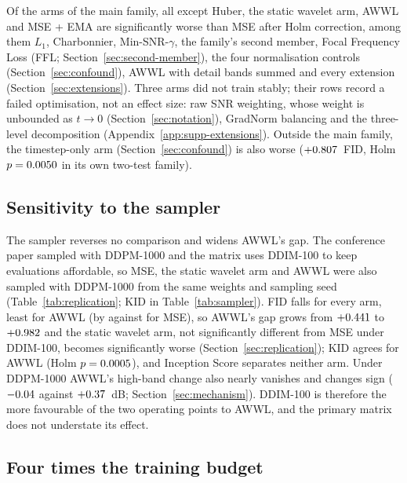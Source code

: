 Of the \nFamilyMain{} arms of the main family, all except Huber, the static
wavelet arm, AWWL and MSE + EMA are significantly worse than MSE after Holm
correction, among them $L_1$, Charbonnier, Min-SNR-$\gamma$, the family's
second member, Focal Frequency Loss (FFL; Section~\ref{sec:second-member}),
the four normalisation controls (Section~\ref{sec:confound}), AWWL with
detail bands summed and every extension (Section~\ref{sec:extensions}). Three
arms did not train stably; their rows record a failed optimisation, not an
effect size: raw SNR weighting, whose weight is unbounded as
$t \to 0$ (Section~\ref{sec:notation}), GradNorm balancing and the
three-level decomposition (Appendix~\ref{app:supp-extensions}). Outside the
main family, the timestep-only arm (Section~\ref{sec:confound}) is also worse
($+0.807$~FID, Holm $p = 0.0050$ in its own two-test family).

\subsection{Sensitivity to the sampler}
\label{sec:sampler}

The sampler reverses no comparison and widens AWWL's gap. The conference
paper sampled with DDPM-1000 and the matrix uses DDIM-100 to keep
\nRunsMatrix{} evaluations affordable, so MSE, the static wavelet arm and AWWL
were also sampled with DDPM-1000 from the same weights and sampling seed
(Table~\ref{tab:replication}; KID in Table~\ref{tab:sampler}). FID falls for
every arm, least for AWWL (by \dropAWWL{} against \dropMSE{} for MSE), so
AWWL's gap grows from $+0.441$ to $+0.982$ and the static wavelet arm,
not significantly different from MSE under DDIM-100, becomes significantly
worse (Section~\ref{sec:replication}); KID agrees for AWWL (Holm
$p = 0.0005$), and Inception Score separates neither arm. Under
DDPM-1000 AWWL's high-band change also nearly vanishes and changes sign
($-0.04$ against $+0.37$~dB;
Section~\ref{sec:mechanism}). DDIM-100 is therefore the more favourable of the
two operating points to AWWL, and the primary matrix does not understate its
effect.

\subsection{Four times the training budget}
\label{sec:budget}

